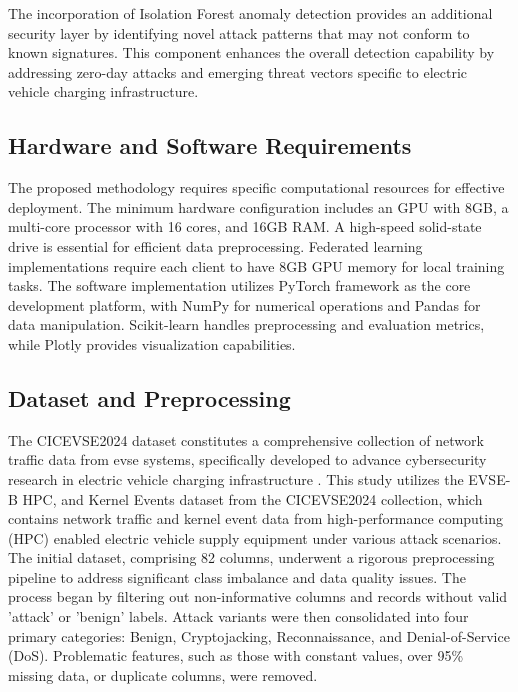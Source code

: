 The incorporation of Isolation Forest anomaly detection provides an additional security layer by identifying novel attack patterns that may not conform to known signatures. This component enhances the overall detection capability by addressing zero-day attacks and emerging threat vectors specific to electric vehicle charging infrastructure.

\newpage
\subsection{Hardware and Software Requirements}
The proposed methodology requires specific computational resources for effective deployment. The minimum hardware configuration includes an GPU with 8GB, a multi-core processor with 16 cores, and 16GB RAM. A high-speed solid-state drive is essential for efficient data preprocessing. Federated learning implementations require each client to have 8GB GPU memory for local training tasks. The software implementation utilizes PyTorch framework as the core development platform, with NumPy for numerical operations and Pandas for data manipulation. Scikit-learn handles preprocessing and evaluation metrics, while Plotly provides visualization capabilities.

\subsection{Dataset and Preprocessing}
\label{subsection:dataset}
The CICEVSE2024 dataset constitutes a comprehensive collection of network traffic data from {\acrfull{evse}} systems, specifically developed to advance cybersecurity research in electric vehicle charging infrastructure \cite{cicevse2024}.
This study utilizes the EVSE-B HPC, and Kernel Events dataset from the CICEVSE2024 collection, which contains network traffic and kernel event data from high-performance computing (HPC) enabled electric vehicle supply equipment under various attack scenarios. The initial dataset, comprising 82 columns, underwent a rigorous preprocessing pipeline to address significant class imbalance and data quality issues. The process began by filtering out non-informative columns and records without valid 'attack' or 'benign' labels. Attack variants were then consolidated into four primary categories: Benign, Cryptojacking, Reconnaissance, and Denial-of-Service (DoS). Problematic features, such as those with constant values, over 95\% missing data, or duplicate columns, were removed.

